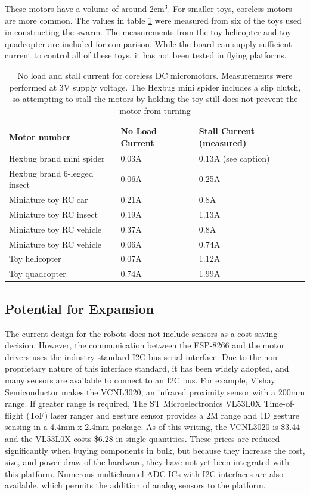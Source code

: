 These motors have a volume of around 2cm$^3$.
For smaller toys, coreless motors are more common. 
The values in table \ref{tab:coreless} were measured from six of the toys used in constructing the swarm.
The measurements from the toy helicopter and toy quadcopter are included for comparison.
While the board can supply sufficient current to control all of these toys, it has not been tested in flying platforms.

\begin{table}
	\begin{tabular}{l l l}
		Motor number & No Load Current & Stall Current (measured)\\
		\hline 
		Hexbug brand mini spider & 0.03A & 0.13A (see caption) \\
		Hexbug brand 6-legged insect & 0.06A & 0.25A \\
		Miniature toy RC car & 0.21A & 0.8A \\
		Miniature toy RC insect & 0.19A & 1.13A \\
		Miniature toy RC vehicle & 0.37A & 0.8A \\
		Miniature toy RC vehicle & 0.06A & 0.74A \\
		Toy helicopter & 0.07A & 1.12A \\
		Toy quadcopter & 0.74A & 1.99A \\
	\end{tabular}
	\caption{No load and stall current for coreless DC micromotors. Measurements were performed at 3V supply voltage. The Hexbug mini spider includes a slip clutch, so attempting to stall the motors by holding the toy still does not prevent the motor from turning}
	\label{tab:coreless}
\end{table}


\subsection{Potential for Expansion} \label{section:Potential_for_Expansion}

The current design for the robots does not include sensors as a cost-saving decision. 
However, the communication between the ESP-8266 and the motor drivers uses the industry standard I2C bus serial interface. 
Due to the non-proprietary nature of this interface standard, it has been widely adopted, and many sensors are available to connect to an I2C bus. 
For example, Vishay Semiconductor makes the VCNL3020, an infrared proximity sensor with a 200mm range. 
If greater range is required, The ST Microelectronics VL53L0X Time-of-flight (ToF) laser ranger and gesture sensor provides a 2M range and 1D gesture sensing in a 4.4mm x 2.4mm package. 
As of this writing, the VCNL3020 is \$3.44 and the VL53L0X costs \$6.28 in single quantities.
These prices are reduced significantly when buying components in bulk, but because they increase the cost, size, and power draw of the hardware, they have not yet been integrated with this platform. 
Numerous multichannel ADC ICs with I2C interfaces are also available, which permits the addition of analog sensors to the platform. 

